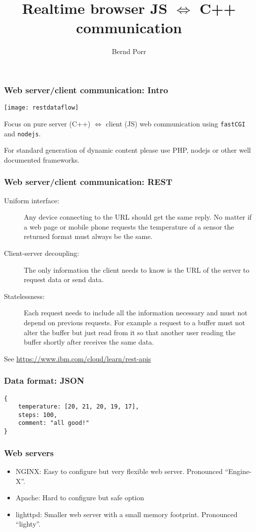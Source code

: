 \documentclass[xcolor=dvipsnames]{beamer}
\date{}
\title{Realtime browser JS $\Leftrightarrow$ C++ communication}
\author{Bernd Porr}
\begin{document}
\begin{frame}
\titlepage
\end{frame}







\begin{frame}[fragile]
  \frametitle{Web server/client communication: Intro}
  \texttt{[image: restdataflow]}

  Focus on pure server (C++) $\Leftrightarrow$ client (JS) web communication
  using \texttt{fastCGI} and \texttt{nodejs}.

  \bigskip

  For standard generation of dynamic content please
  use PHP, nodejs or other well documented frameworks.

\end{frame}



\begin{frame}[fragile]
  \frametitle{Web server/client communication: REST}
\begin{description}
\item[Uniform interface:] Any device connecting to the URL should
  get the same reply. No matter if a web page or mobile phone
  requests the temperature of a sensor the returned format must always be the same.
\item[Client-server decoupling:] The only information
  the client needs to know is the URL of the server to request data or send data.
\item[Statelessness:] Each request needs to include all the
  information necessary and must not depend on previous requests. For
  example a request to a buffer must not alter the
  buffer but just read from it so that another user reading the buffer
  shortly after receives the same data.
\end{description}
See \url{https://www.ibm.com/cloud/learn/rest-apis}
\end{frame}



\begin{frame}[fragile]
  \frametitle{Data format: JSON}

\begin{verbatim}
{
    temperature: [20, 21, 20, 19, 17],
    steps: 100,
    comment: "all good!"
}
\end{verbatim}
\end{frame}

\begin{frame}[fragile]
  \frametitle{Web servers}
\begin{itemize}
  \item NGINX: Easy to configure but very flexible web server. Pronounced ``Engine-X''.
  \item Apache: Hard to configure but safe option
  \item lighttpd: Smaller web server with a small memory footprint. Pronounced ``lighty''.
\end{itemize}
\end{frame}
\end{document}
